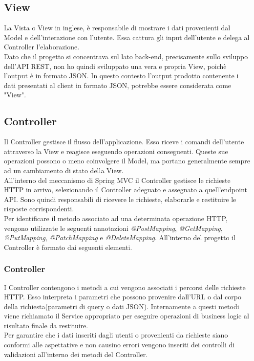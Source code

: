 \subsection{View}
La Vista o View in inglese, è responsabile di mostrare i dati provenienti dal Model e dell'interazione con l'utente. Essa cattura gli input dell'utente e delega al Controller l'elaborazione.\\
Dato che il progetto si concentrava sul lato back-end, precisamente sullo sviluppo dell'API REST, non ho quindi sviluppato una vera e propria View, poichè l'output è in formato JSON. In questo contesto l'output prodotto contenente i dati presentati al client in formato JSON, potrebbe essere considerata come "View".\\

\subsection{Controller}
Il Controller gestisce il flusso dell'applicazione. Esso riceve i comandi dell'utente attraverso la View e reagisce eseguendo operazioni conseguenti. Queste sue operazioni possono o meno coinvolgere il Model, ma portano generalmente sempre ad un cambiamento di stato della View.\\
All'interno del meccanismo di Spring MVC il Controller gestisce le richieste HTTP in arrivo, selezionando il Controller adeguato e assegnato a quell'endpoint API. Sono quindi responsabili di ricevere le richieste, elaborarle e restituire le risposte corrispondenti.\\
Per identificare il metodo associato ad una determinata operazione HTTP, vengono utilizzate le seguenti annotazioni \textit{@PostMapping}, \textit{@GetMapping}, \textit{@PutMapping}, \textit{@PatchMapping} e \textit{@DeleteMapping}. 
All'interno del progetto il Controller è formato dai seguenti elementi.
\subsubsection*{Controller}
I Controller contengono i metodi a cui vengono associati i percorsi delle richieste HTTP. Esso interpreta i parametri che possono provenire dall'URL o dal corpo della richiesta(parametri di query o dati JSON). Internamente a questi metodi viene richiamato il Service appropriato per eseguire operazioni di business logic al risultato finale da restituire.\\
Per garantire che i dati inseriti dagli utenti o provenienti da richieste siano conformi alle aspettative e non causino errori vengono inseriti dei controlli di validazioni all'interno dei metodi del Controller.
